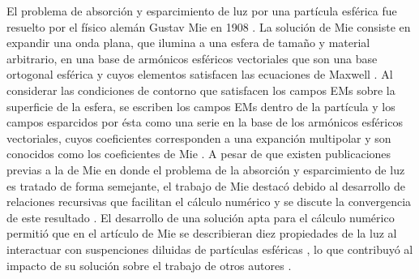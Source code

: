 El problema de absorción y esparcimiento de luz por una partícula esférica fue resuelto por el físico alemán Gustav Mie en 1908 \cite{mie1908metallosung}. La solución de Mie consiste en expandir una onda plana, que ilumina a una esfera de tamaño y material arbitrario, en una base de armónicos esféricos vectoriales que son una base ortogonal esférica y cuyos elementos satisfacen las ecuaciones de Maxwell \cite{bohren1998absorption}. Al considerar las condiciones de contorno que satisfacen los campos EMs sobre la superficie de la esfera, se escriben los campos EMs dentro de la partícula y los campos esparcidos por ésta como una serie en la base de los armónicos esféricos vectoriales, cuyos coeficientes corresponden a una expanción multipolar y son conocidos como los coeficientes de Mie \cite{bohren1998absorption}. A pesar de que existen publicaciones previas a la de Mie en donde  el problema de la absorción y esparcimiento de luz es tratado de forma semejante, el trabajo de Mie destacó debido al desarrollo de relaciones recursivas que facilitan el cálculo numérico y se discute la convergencia de este resultado \cite{horvath2009historic}. El desarrollo de una solución apta para el cálculo numérico permitió que en el artículo de Mie se describieran diez propiedades de la luz al interactuar con suspenciones diluidas de partículas esféricas \cite{mie1908metallosung}, lo que contribuyó al impacto de su solución sobre el trabajo de otros autores \cite{horvath2009historic}. 

